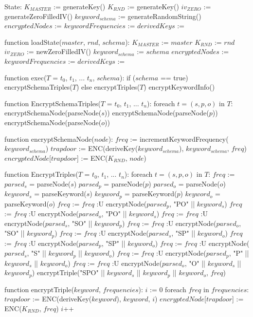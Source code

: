 State:
    $K_{MASTER}$ := generateKey() 
    $K_{RND}$ := generateKey() 
    $iv_{ZERO}$ := generateZeroFilledIV()
    $keyword_{schema}$ := generateRandomString()
    $encryptedNodes$ := {}
    $keywordFrequencies$ := {}
    $derivedKeys$ := {} 
    

function loadState($master$, $rnd$, $schema$):
    $K_{MASTER}$ := $master$ 
    $K_{RND}$ := $rnd$
    $iv_{ZERO}$ := newZeroFilledIV()
    $keyword_{schema}$ := $schema$
    $encryptedNodes$ := {}
    $keywordFrequencies$ := {}
    $derivedKeys$ := {}

function exec($T$ = {$t_0$, $t_1$, ... $t_n$}, $schema$):
    if ($schema$ == true)
        encryptSchemaTriples($T$)
    else
        encryptTriples($T$)
    encryptKeywordInfo()

function EncryptSchemaTriples($T$ = {$t_0$, $t_1$, ... $t_n$}):
    foreach $t = (s,p,o)$ in $T$:
        encryptSchemaNode(parseNode($s$))
        encryptSchemaNode(parseNode($p$))
        encryptSchemaNode(parseNode($o$))
        
function encryptSchemaNode($node$):
    $freq$ := incrementKeywordFrequency($keyword_{schema}$)
    $trapdoor$ := ENC(deriveKey($keyword_{schema}$), $keyword_{schema}$, $freq$)
    $encryptedNode$[$trapdoor$] := ENC($K_{RND}$, $node$)

function EncryptTriples($T$ = {$t_0$, $t_1$, ... $t_n$}):
	foreach $t = (s,p,o)$ in $T$:
        $freq$ := {}
        $parsed_s$ = parseNode($s$)
        $parsed_p$ = parseNode($p$)
        $parsed_o$ = parseNode($o$)
        $keyword_s$ = parseKeyword($s$)
        $keyword_p$ = parseKeyword($p$)
        $keyword_o$ = parseKeyword($o$)
        $freq$ := $freq$ :U {encryptNode($parsed_p$, "PO" || $keyword_s$)}
        $freq$ := $freq$ :U {encryptNode($parsed_o$, "PO" || $keyword_s$)}
        $freq$ := $freq$ :U {encryptNode($parsed_s$, "SO" || $keyword_p$)}
        $freq$ := $freq$ :U {encryptNode($parsed_o$, "SO" || $keyword_p$)}
        $freq$ := $freq$ :U {encryptNode($parsed_s$, "SP" || $keyword_o$)}
        $freq$ := $freq$ :U {encryptNode($parsed_p$, "SP" || $keyword_o$)}
        $freq$ := $freq$ :U {encryptNode($parsed_s$, "S" || $keyword_p$ || $keyword_o$)}
        $freq$ := $freq$ :U {encryptNode($parsed_p$, "P" || $keyword_s$ || $keyword_o$)}
        $freq$ := $freq$ :U {encryptNode($parsed_o$, "O" || $keyword_s$ || $keyword_p$)}
        encryptTriple("SPO" || $keyword_s$ || $keyword_p$ || $keyword_o$, $freq$)
 
function encryptTriple($keyword$, $frequencies$): 
    $i$ := 0
    foreach $freq$ in $frequencies$:
        $trapdoor$ := ENC(deriveKey($keyword$), $keyword$, $i$)
        $encryptedNode$[$trapdoor$] := ENC($K_{RND}$, $freq$)
        $i$++

